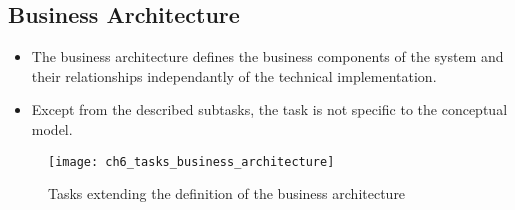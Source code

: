 \subsection{Business Architecture}

\begin{itemize}
	\item The business architecture defines the business components of the system and their relationships independantly of the technical implementation.
	\item Except from the described subtasks, the task is not specific to the conceptual model.
\end{itemize}

\begin{figure}[htpb] \centering 
	\texttt{[image: ch6\_tasks\_business\_architecture]} 
	\caption{Tasks extending the definition of the business architecture} 
	\label{fig:ch6_tasks_business_architecture} 
\end{figure}

